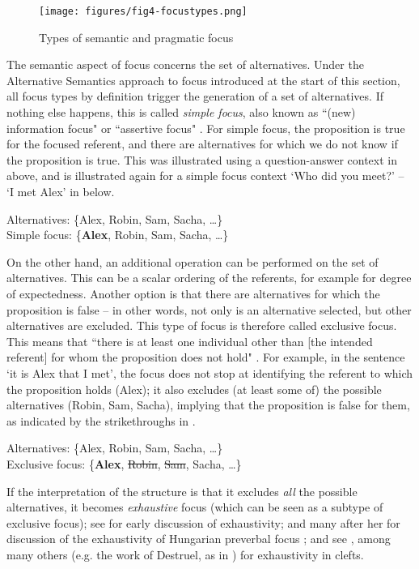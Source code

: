 \documentclass[output=paper]{langscibook}
\begin{document}
\begin{figure}
\texttt{[image: figures/fig4-focustypes.png]}
\caption{Types of semantic and pragmatic focus}
\label{fig:focustypes}
\end{figure}

The semantic aspect of focus concerns the set of alternatives. Under the Alternative Semantics approach to focus introduced at the start of this section, all focus types by definition trigger the generation of a set of alternatives. If nothing else happens, this is called \textit{simple focus}, also known as ``(new) information focus" \citep{É.Kiss1998} or ``assertive focus" \citep{HymanWatters1984}. For simple focus, the proposition is true for the focused referent, and there are alternatives for which we do not know if the proposition is true. This was illustrated using a question-answer context in  above, and is illustrated again for a simple focus context ‘Who did you meet?’ -- ‘I met Alex’ in  below.

\ea
\label{bkm:Ref134522227}
\gll
Alternatives:   {\{Alex, Robin, Sam, Sacha, …\}}\\
{Simple focus}:  {\{\textbf{Alex}, Robin, Sam, Sacha, …\}}\\
\z

On the other hand, an additional operation can be performed on the set of alternatives. This can be a scalar ordering of the referents, for example for degree of expectedness. Another option is that there are alternatives for which the proposition is false – in other words, not only is an alternative selected, but other alternatives are excluded. This type of focus is therefore called exclusive focus. This means that ``there is at least one individual other than [the intended referent] for whom the proposition does not hold" \citep[147]{Kenesei2006}. For example, in the sentence ‘it is Alex that I met’, the focus does not stop at identifying the referent to which the proposition holds (Alex); it also excludes (at least some of) the possible alternatives (Robin, Sam, Sacha), implying that the proposition is false for them, as indicated by the strikethroughs in . 

\ea
\label{bkm:Ref1}
\gll
{Alternatives:}   {\{Alex, Robin, Sam, Sacha, …\}}\\
{Exclusive focus:}  {\{\textbf{Alex}, \sout{Robin}, \sout{Sam}, Sacha, …\}}\\
\z

If the interpretation of the structure is that it excludes \textit{all} the possible alternatives, it becomes \textit{exhaustive} focus (which can be seen as a subtype of exclusive focus); see \citet{Szabolcsi1981} for early discussion of exhaustivity; \citet{É.Kiss1998} and many after her for discussion of the exhaustivity of Hungarian preverbal focus \citep[e.g.][]{OneaBeaver2009}; and see \citet{Horn1981,DrenhausEtAl2011}, among many others (e.g. the work of Destruel, as in \citealt{DestruelEtAl2015,DestruelDeVeaugh-Geiss2018}) for exhaustivity in clefts. 
\end{document}
